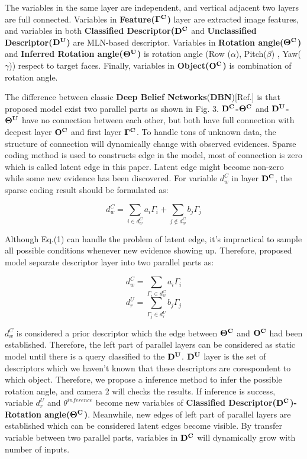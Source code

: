 \documentclass[journal]{IEEEtran}
\begin{document}
The variables in the same layer are independent, and vertical adjacent two layers are full connected. Variables in \textbf{Feature($\bf{\Gamma^{C}}$)} layer are extracted image features, and variables in both \textbf{Classified Descriptor($\bf{D^C}$} and \textbf{Unclassified Descriptor($\bf{D^U}$)} are MLN-based descriptor. Variables in \textbf{Rotation angle($\bf{\Theta^{C}}$)} and \textbf{Inferred Rotation angle($\bf{\Theta^U}$)} is rotation angle (Row ($\alpha$), Pitch($\beta$) , Yaw($\gamma$)) respect to target faces. Finally, variables in \textbf{Object($\bf{O^C}$)} is combination of rotation angle.


The difference between classic \textbf{Deep Belief Networks}(\textbf{DBN})[Ref.] is that proposed model exist two parallel parts as shown in Fig. 3. \textbf{$\bf{D^C}$-$\bf{\Theta^{C}}$} and \textbf{$\bf{D^U}$-$\bf{\Theta^U}$} have no connection between each other, but both have full connection with deepest layer $\bf{O^C}$ and first layer \textbf{$\bf{\Gamma^{C}}$}. To handle tons of unknown data, the structure of connection will dynamically change with observed evidences. Sparse coding method is used to constructs edge in the model, most of connection is zero which is called latent edge in this paper. Latent edge might become non-zero while some new evidence has been discovered. For variable $d^C_w$ in layer $\bf{D^C}$, the sparse coding result should be formulated as:

\begin{equation}
d^C_w=\sum_{i\in{d^C_w}}a_{i}\Gamma_{i}+\sum_{j\notin{d^C_w}}b_{j}\Gamma_{j}
\end{equation}

Although Eq.(1) can handle the problem of latent edge, it's impractical to sample all possible conditions whenever new evidence showing up. Therefore, proposed model separate descriptor layer into two parallel parts as: 

\begin{equation}
d^C_w=\sum_{\Gamma_{i}\in{d^C_w}}a_{i}\Gamma_{i}
\end{equation}
\begin{equation}
d^U_r=\sum_{\Gamma_{j}\in{d^U_r}}b_{j}\Gamma_{j}
\end{equation}

$d^C_w$ is considered a prior descriptor which the edge between $\bf{\Theta^{C}}$ and $\bf{O^C}$ had been established. Therefore, the left part of parallel layers can be considered as static model until there is a query classified to the $\bf{D^U}$. $\bf{D^U}$ layer is the set of descriptors which we haven't known that these descriptors are corespondent to which object. Therefore, we propose a inference method to infer the possible rotation angle, and camera 2 will checks the results. If inference is success, variable $d^U_r$ and $\theta^{inference}$ become new variables of \textbf{Classified Descriptor($\bf{D^C}$)-Rotation angle($\bf{\Theta^{C}}$)}. Meanwhile, new edges of left part of parallel layers are established which can be considered latent edges become visible. By transfer variable between two parallel parts, variables in $\bf{D^C}$ will dynamically grow with number of inputs. 
\end{document}
